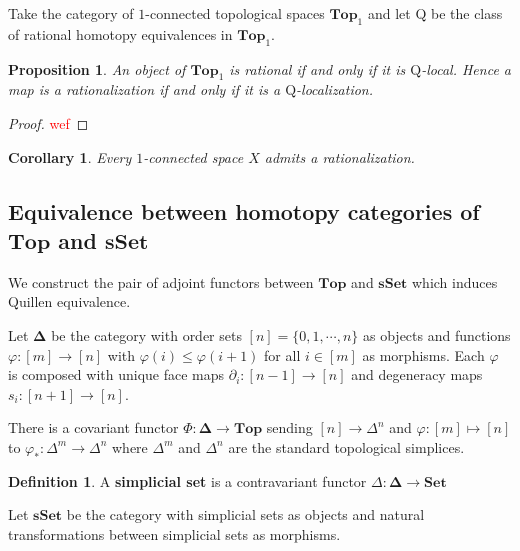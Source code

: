 \documentclass[psamsfonts]{amsart}
\newtheorem{cor}[thm]{Corollary}
\newtheorem{prop}[thm]{Proposition}
\theoremstyle{definition}
\newtheorem{defn}[thm]{Definition}
\theoremstyle{remark}
\newcommand{\Top}{\mathbf{Top}}
\newcommand{\sSet}{\mathbf{sSet}}
\numberwithin{equation}{section}
\begin{document}
Take the category of $1$-connected topological spaces $\Top_1$ and let $\mathrm{Q}$ be the class of rational homotopy equivalences in $\Top_1$.

\begin{prop}
An object of $\Top_1$ is rational if and only if it is $\mathrm{Q}$-local. Hence a map is a rationalization if and only if it is a $\mathrm{Q}$-localization.
\end{prop}
\begin{proof}
\textcolor{red}{wef}
\end{proof}

\begin{cor}
Every $1$-connected space $X$ admits a rationalization.
\end{cor}

\subsection{Equivalence between homotopy categories of $\Top$ and $\sSet$} We construct the pair of adjoint functors between $\Top$ and $\sSet$ which induces Quillen equivalence.\medbreak

Let $\mathbf{\Delta}$ be the category with order sets $[n]=\{0,1,\cdots,n\}$ as objects and functions $\varphi:[m]\to[n]$ with $\varphi(i)\leq\varphi(i+1)$ for all $i\in[m]$ as morphisms. Each $\varphi$ is composed with unique face maps $\partial_i:[n-1]\to[n]$ and degeneracy maps $s_i:[n+1]\to[n]$.

There is a covariant functor $\Phi:\mathbf{\Delta}\to\Top$ sending $[n]\to\Delta^n$ and $\varphi:[m]\mapsto[n]$ to $\varphi_\ast:\Delta^m\to\Delta^n$ where $\Delta^m$ and $\Delta^n$ are the standard topological simplices.

\begin{defn}
A \textbf{simplicial set} is a contravariant functor $\Delta:\mathbf{\Delta}\to\mathbf{Set}$
\end{defn}

Let $\sSet$ be the category with simplicial sets as objects and natural transformations between simplicial sets as morphisms.\medbreak
\end{document}
